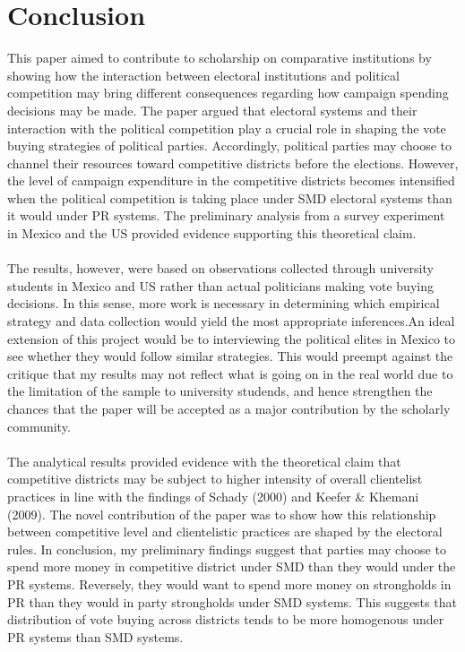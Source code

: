 \documentclass{article}
\begin{document}
\section{Conclusion}

This paper aimed to contribute to scholarship on comparative institutions by showing how the interaction between electoral institutions and political competition may bring different consequences regarding how campaign spending decisions may be made. The paper argued that electoral systems and their interaction with the political competition play a crucial role in shaping the vote buying strategies of political parties. Accordingly, political parties may choose to channel their resources toward competitive districts before the elections. However, the level of campaign expenditure in the competitive districts becomes intensified when the political competition is taking place under SMD electoral systems than it would under PR systems. The preliminary analysis from a survey experiment in Mexico and the US provided evidence supporting this theoretical claim.\\
\\
The results, however, were based on observations collected through university students in Mexico and US rather than actual politicians making vote buying decisions. In this sense, more work is necessary in determining which empirical strategy and data collection would yield the most appropriate inferences.An ideal extension of this project would be to interviewing the political elites in Mexico to see whether they would follow similar strategies. This would preempt against the critique that my results may not reflect what is going on in the real world due to the limitation of the sample to university studends, and hence strengthen the chances that the paper will be accepted as a major contribution by the scholarly community.\\
\\
The analytical results provided evidence with the theoretical claim that competitive districts may be subject to higher intensity of overall clientelist practices in line with the findings of Schady (2000) and Keefer \& Khemani (2009). The novel contribution of the paper was to show how this relationship between competitive level and clientelistic practices are shaped by the electoral rules. In conclusion, my preliminary findings suggest that parties may choose to spend more money in competitive district under SMD than they would under the PR systems. Reversely, they would want to spend more money on strongholds in PR than they would in party strongholds under SMD systems. This suggests that distribution of vote buying across districts tends to be more homogenous under PR systems than SMD systems.\\
\end{document}

